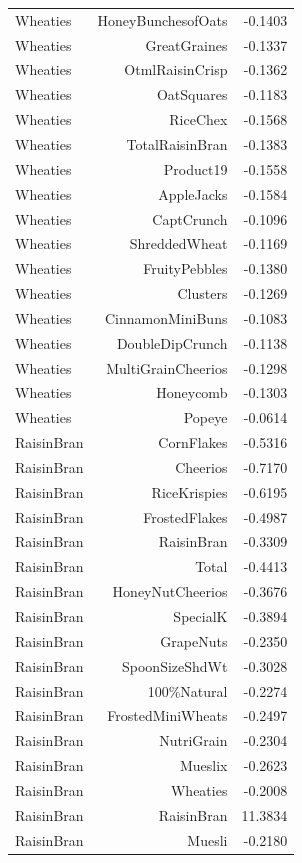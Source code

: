\begin{longtable}{@{}lrr@{}}
Wheaties & HoneyBunchesofOats & -0.1403 \\
Wheaties & GreatGraines & -0.1337 \\
Wheaties & OtmlRaisinCrisp & -0.1362 \\
Wheaties & OatSquares & -0.1183 \\
Wheaties & RiceChex & -0.1568 \\
Wheaties & TotalRaisinBran & -0.1383 \\
Wheaties & Product19 & -0.1558 \\
Wheaties & AppleJacks & -0.1584 \\
Wheaties & CaptCrunch & -0.1096 \\
Wheaties & ShreddedWheat & -0.1169 \\
Wheaties & FruityPebbles & -0.1380 \\
Wheaties & Clusters & -0.1269 \\
Wheaties & CinnamonMiniBuns & -0.1083 \\
Wheaties & DoubleDipCrunch & -0.1138 \\
Wheaties & MultiGrainCheerios & -0.1298 \\
Wheaties & Honeycomb & -0.1303 \\
Wheaties & Popeye & -0.0614 \\
RaisinBran & CornFlakes & -0.5316 \\
RaisinBran & Cheerios & -0.7170 \\
RaisinBran & RiceKrispies & -0.6195 \\
RaisinBran & FrostedFlakes & -0.4987 \\
RaisinBran & RaisinBran & -0.3309 \\
RaisinBran & Total & -0.4413 \\
RaisinBran & HoneyNutCheerios & -0.3676 \\
RaisinBran & SpecialK & -0.3894 \\
RaisinBran & GrapeNuts & -0.2350 \\
RaisinBran & SpoonSizeShdWt & -0.3028 \\
RaisinBran & 100\%Natural & -0.2274 \\
RaisinBran & FrostedMiniWheats & -0.2497 \\
RaisinBran & NutriGrain & -0.2304 \\
RaisinBran & Mueslix & -0.2623 \\
RaisinBran & Wheaties & -0.2008 \\
RaisinBran & RaisinBran & 11.3834 \\
RaisinBran & Muesli & -0.2180 \\

\end{longtable}
